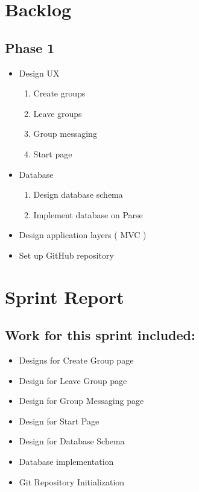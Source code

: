 \documentclass[11pt]{article}
\begin{document}
\section*{Backlog}

\subsection*{Phase 1}

	
	\begin{itemize}
	\item Design UX
		\begin{enumerate}
		\item Create groups
		\item Leave groups
		\item Group messaging
		\item Start page
		\end{enumerate}
	\item Database
		\begin{enumerate}
		\item Design database schema
		\item Implement database on Parse
		\end{enumerate}
	\item Design application layers ( MVC )
	\item Set up GitHub repository
	\end{itemize}
	
\section*{Sprint Report}

\subsection*{Work for this sprint included:}
	\begin{itemize}
	\item Designs for Create Group page
	\item Design for Leave Group page
	\item Design for Group Messaging page
	\item Design for Start Page
	\item Design for Database Schema
	\item Database implementation
	\item Git Repository Initialization
	\end{itemize}
\end{document}
